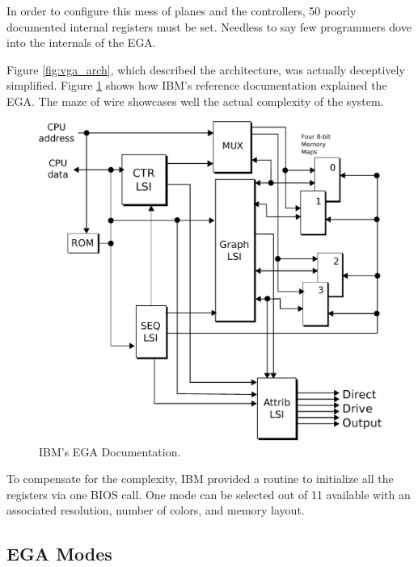 \documentclass[book.tex]{subfiles}
\begin{document}
\par
In order to configure this mess of planes and the controllers, 50 poorly documented internal registers must be set. Needless to say few programmers dove into the internals of the EGA.\\
\par
  Figure \ref{fig:vga_arch}, which described the architecture, was actually deceptively simplified. Figure \ref{fig:ibm_ega} shows how IBM's reference documentation explained the EGA. The maze of wire showcases well the actual complexity of the system.\\
 \par
 \vspace{10pt}
 \begin{figure}[H]
\centering
\includegraphics[width=\textwidth]{imgs/drawings/ibm_ega.eps}
\caption{IBM's EGA Documentation.}
\label{fig:ibm_ega}
\end{figure}

\bigskip



To compensate for the complexity, IBM provided a routine to initialize all the registers via one BIOS call. One mode can be selected out of 11 available with an associated resolution, number of colors, and memory layout.

\subsection{EGA Modes}
\end{document}
